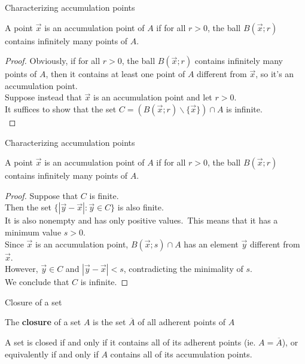 \documentclass{beamer}
\begin{document}
\begin{frame}{Characterizing accumulation points}
\begin{thm}
A point $\vec x$ is an accumulation point of $A$ if for all $r > 0$, the ball $B(\vec x; r)$ contains infinitely many points of $A$.
\end{thm}
\pause
\begin{proof}
\pause
Obviously, if for all $r > 0$, the ball $B(\vec x; r)$ contains infinitely many points of $A$, then it contains at least one point of $A$ different from $\vec x$, so it's an accumulation point.\\
\pause
Suppose instead that $\vec x$ is an accumulation point and let $r > 0$.\\
\pause
It suffices to show that the set $C = (B(\vec x; r)\backslash\{\vec x\})\cap A$ is infinite.\\
\end{proof}
\end{frame}

\begin{frame}{Characterizing accumulation points}
\begin{thm}
A point $\vec x$ is an accumulation point of $A$ if for all $r > 0$, the ball $B(\vec x; r)$ contains infinitely many points of $A$.
\end{thm}
\pause
\begin{proof}
\pause
Suppose that $C$ is finite.\\
\pause
Then the set $\{|\vec y - \vec x|: \vec y\in C\}$ is also finite.\\
\pause
It is also nonempty and has only positive values.\ \pause This means that it has a minimum value $s > 0$.\\
\pause
Since $\vec x$ is an accumulation point, $B(\vec x; s)\cap A$ has an element $\vec y$ different from $\vec x$.\\
\pause
However, $\vec y\in C$ and $|\vec y - \vec x| < s$, contradicting the minimality of $s$.\\
\pause
We conclude that $C$ is infinite.
\end{proof}
\end{frame}


\begin{frame}{Closure of a set}
\begin{defn}
The \textbf{closure} of a set $A$ is the set $\overline{A}$ of all adherent points of $A$
\end{defn}
\pause
\begin{thm}
A set is closed if and only if it contains all of its adherent points (ie. $A= \overline{A}$), or equivalently if and only if $A$ contains all of its accumulation points. 
\end{thm}
\end{frame}
\end{document}
